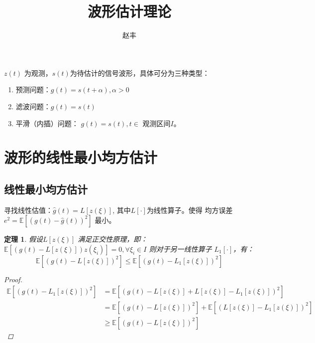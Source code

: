 \documentclass{ctexart}
\numberwithin{equation}{section}
\newtheorem{thm}{定理}
\def\E{\mathbb{E}}
\begin{document}
\title{波形估计理论}
\author{赵丰}
\maketitle
$z(t)$ 为观测，$s(t)$为待估计的信号波形，具体可分为三种类型：
\begin{enumerate}
\item 预测问题：$ g(t) = s(t+\alpha),\alpha>0 $
\item 滤波问题：$ g(t) = s(t)$
\item 平滑（内插）问题： $ g(t)=s(t), t\in $ 观测区间$I$。
\end{enumerate}

\section{波形的线性最小均方估计}
\subsection{线性最小均方估计}
寻找线性估值：$\hat{g}(t) = L[z(\xi)]$, 其中$L[\cdot]$为线性算子。使得 均方误差 $ e^2 = \E[(g(t)-\hat{g}(t))^2] $ 最小。
\begin{thm}
假设$L[z(\xi)]$ 满足正交性原理，即：
$\E[(g(t)-L[z(\xi)])z(\xi_i)]=0,\forall \xi_i \in I$
则对于另一线性算子 $L_1[\cdot]$，有：
\begin{equation}
\E[(g(t)-L[z(\xi)])^2]\leq \E[ (g(t)-L_1[z(\xi)])^2 ]
\end{equation}
\begin{proof}
\begin{align*}
\E[ (g(t)-L_1[z(\xi)])^2 ] & = \E[ (g(t)-L[z(\xi)]+L[z(\xi)]-L_1[z(\xi)])^2 ] \\
& = \E[ (g(t)-L[z(\xi)])^2 ] + \E[ (L[z(\xi)]-L_1[z(\xi)])^2 ] \\
& \geq \E[ (g(t)-L[z(\xi)])^2 ]
\end{align*}
\end{proof}
\end{thm}
\end{document}
